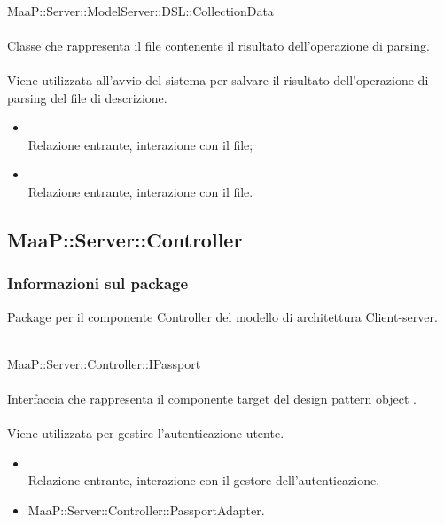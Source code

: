 \\
MaaP::Server::ModelServer::DSL::CollectionData\\
\\
Classe che rappresenta il file contenente il risultato dell'operazione di parsing.\\
\\
Viene utilizzata all'avvio del sistema per salvare il risultato dell'operazione di parsing del file di descrizione.
\begin{itemize}
\item{}\\
Relazione entrante, interazione con il file;
\item{}\\
Relazione entrante, interazione con il file.
\end{itemize}


\subsection{MaaP::Server::Controller}
\subsubsection{Informazioni sul package}
Package per il componente Controller del modello di architettura Client-server.

\\
MaaP::Server::Controller::IPassport\\
\\
Interfaccia che rappresenta il componente target del design pattern object .\\
\\
Viene utilizzata per gestire l'autenticazione utente.
\begin{itemize}
\item{}\\
Relazione entrante, interazione con il gestore dell'autenticazione.
\end{itemize}
\begin{itemize}
\item MaaP::Server::Controller::PassportAdapter.
\end{itemize}

